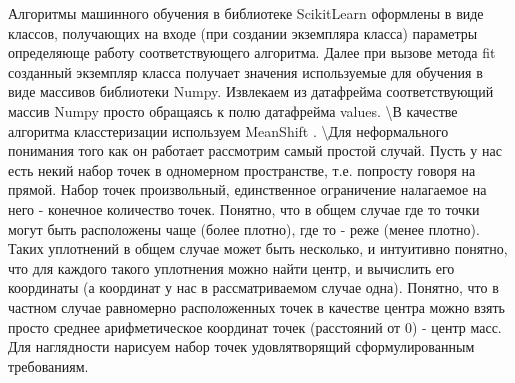 \documentclass[11pt]{article}
\begin{document}
    Алгоритмы машинного обучения в библиотеке ScikitLearn оформлены в виде
классов, получающих на входе (при создании экземпляра класса) параметры
определяюще работу соответствующего алгоритма. Далее при вызове метода
fit созданный экземпляр класса получает значения используемые для
обучения в виде массивов библиотеки Numpy. Извлекаем из датафрейма
соответствующий массив Numpy просто обращаясь к полю датафрейма values.
\textbackslash{}В качестве алгоритма класстеризации используем MeanShift
\cite{litlink2} \cite{litlink5}. \textbackslash{}Для неформального
понимания того как он работает рассмотрим самый простой случай. Пусть у
нас есть некий набор точек в одномерном пространстве, т.е. попросту
говоря на прямой. Набор точек произвольный, единственное ограничение
налагаемое на него - конечное количество точек. Понятно, что в общем
случае где то точки могут быть расположены чаще (более плотно), где то -
реже (менее плотно). Таких уплотнений в общем случае может быть
несколько, и интуитивно понятно, что для каждого такого уплотнения можно
найти центр, и вычислить его координаты (а координат у нас в
рассматриваемом случае одна). Понятно, что в частном случае равномерно
расположенных точек в качестве центра можно взять просто среднее
арифметическое координат точек (расстояний от 0) - центр масс. Для
наглядности нарисуем набор точек удовлятворящий сформулированным
требованиям.
\end{document}
